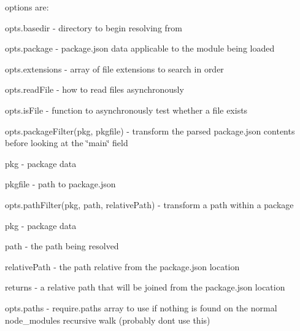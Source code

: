 options are\+:


\begin{DoxyItemize}
\item opts.\+basedir -\/ directory to begin resolving from
\item opts.\+package -\/ {\ttfamily package.\+json} data applicable to the module being loaded
\item opts.\+extensions -\/ array of file extensions to search in order
\item opts.\+read\+File -\/ how to read files asynchronously
\item opts.\+is\+File -\/ function to asynchronously test whether a file exists
\item {\ttfamily opts.\+package\+Filter(pkg, pkgfile)} -\/ transform the parsed package.\+json contents before looking at the \char`\"{}main\char`\"{} field
\begin{DoxyItemize}
\item pkg -\/ package data
\item pkgfile -\/ path to package.\+json
\end{DoxyItemize}
\item {\ttfamily opts.\+path\+Filter(pkg, path, relative\+Path)} -\/ transform a path within a package
\begin{DoxyItemize}
\item pkg -\/ package data
\item path -\/ the path being resolved
\item relative\+Path -\/ the path relative from the package.\+json location
\item returns -\/ a relative path that will be joined from the package.\+json location
\end{DoxyItemize}
\item opts.\+paths -\/ require.\+paths array to use if nothing is found on the normal {\ttfamily node\+\_\+modules} recursive walk (probably don\textquotesingle{}t use this)


\end{DoxyItemize}
